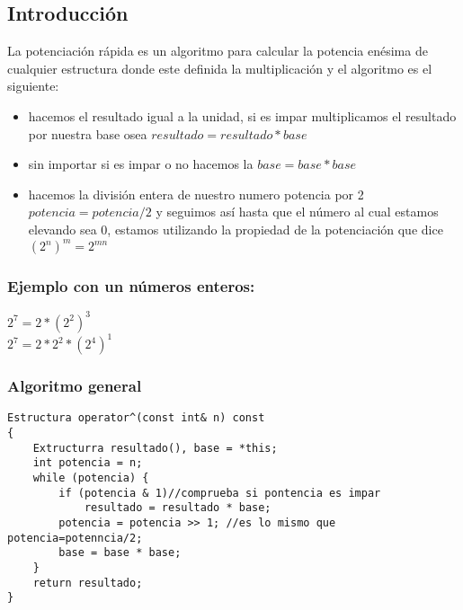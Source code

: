 \subsection{Introducción}
La potenciación rápida es un algoritmo para calcular la potencia enésima de cualquier estructura donde este definida la multiplicación y el algoritmo es el siguiente:
\begin{itemize}
\item hacemos el resultado igual a la unidad, si es impar multiplicamos el resultado por nuestra base  osea $resultado = resultado * base$
\item sin importar si es impar o no hacemos la $base =  base * base$
\item hacemos la división entera de nuestro numero  potencia por 2 $potencia=potencia/2$  y seguimos así hasta que el  número al cual estamos elevando sea 0, estamos utilizando la propiedad de la potenciación que dice $\left ( 2^{n} \right )^m=2^{mn}$
\end{itemize}

\subsubsection{Ejemplo con un números enteros:}

$2^{7} = 2* \left ( 2^{2}\right )^{3}$
\\$2^{7} = 2*2^{2} *\left (2^{4} \right )^{1}$

\subsubsection{Algoritmo general}
\begin{minipage}{\textwidth}
\begin{lstlisting}[style=C,caption=operadorPotencia]
Estructura operator^(const int& n) const
{
    Extructurra resultado(), base = *this;
    int potencia = n;
    while (potencia) {
        if (potencia & 1)//comprueba si pontencia es impar
            resultado = resultado * base;
        potencia = potencia >> 1; //es lo mismo que potencia=potenncia/2;
        base = base * base;
    }
    return resultado;
}
\end{lstlisting}
\end{minipage}
